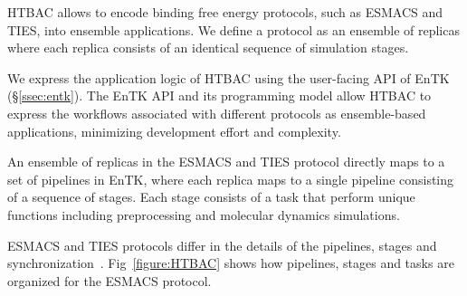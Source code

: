 HTBAC %
allows to %
encode binding free energy protocols, such as ESMACS and TIES, into ensemble
applications\@. We define a protocol as an ensemble of replicas where each
replica consists of an identical sequence of simulation stages.
 


We express the application logic of HTBAC using the user-facing API 
of EnTK (\S\ref{ssec:entk}). 
 
The EnTK %
API and its programming model 
allow HTBAC to express the workflows associated with different protocols as
ensemble-based applications, %
minimizing development effort and complexity.

An ensemble of replicas in the ESMACS and TIES protocol directly maps to a set of
pipelines in EnTK, where each replica maps to a single pipeline consisting of
a sequence of stages. Each stage consists of a task
 that perform unique functions including preprocessing and
molecular dynamics simulations. 

ESMACS and TIES protocols differ in the details of the pipelines, stages and
synchronization~\cite{Bhati2017}. 
Fig~\ref{figure:HTBAC} %
shows how pipelines, stages and tasks are organized for the ESMACS
protocol.

